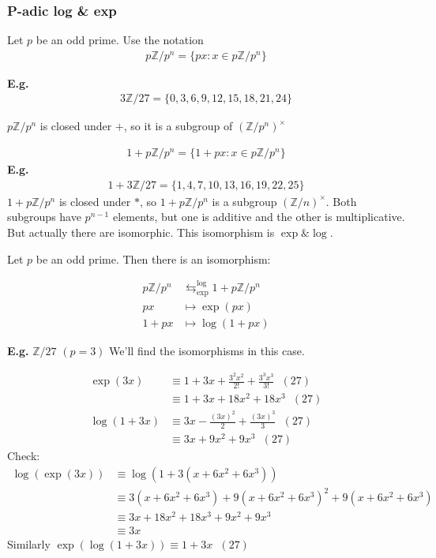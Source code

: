 \documentclass[11pt]{article}
\begin{document}
\subsubsection{P-adic log \& exp}
Let $p$ be an odd prime. Use the notation 
\begin{align*}
	p\mathbb{Z}/p^n = \{ px \colon x \in p\mathbb{Z}/p^n \}
\end{align*}

\textbf{E.g.}
\begin{align*}
	3\mathbb{Z}/27 = \{0,3,6,9,12,15,18,21,24\}
\end{align*}

$p\mathbb{Z}/p^n$ is closed under $+$, so it is a subgroup of $(\mathbb{Z}/p^n)^\times $

\begin{align*}
	1+p\mathbb{Z}/p^n = \{ 1+px \colon x \in p\mathbb{Z}/p^n \}
\end{align*}
\textbf{E.g.}
\begin{align*}
	1+3\mathbb{Z}/27 = \{1,4,7,10,13,16,19,22,25\}
\end{align*}
$1+p\mathbb{Z}/p^n $ is closed under $*$, so $1+p\mathbb{Z}/p^n $ is a subgroup $(\mathbb{Z}/n)^\times$. Both subgroups have $p^{n-1}$ elements, but one is additive and the other is multiplicative. But actually there are isomorphic. This isomorphism is $\exp \& \log$.
\begin{theorem}
Let $p$ be an odd prime. Then there is an isomorphism:

	\begin{align*}
		p\mathbb{Z}/p^n &\leftrightarrows^{{\text{log}}}_{\text{exp}} 1 + p\mathbb{Z}/p^n\\[1em]
		px &\longmapsto \exp(px)\\
		1+px &\longmapsto \log(1+px) 	
	\end{align*}
\end{theorem}
\textbf{E.g.} $\mathbb{Z}/27$  $(p=3)$ We'll find the isomorphisms in this case.

\begin{align*}
	\exp(3x) &\equiv 1 +3x + \frac{3^2x^2}{2!} +\frac{3^3x^3}{3!}\hspace{7pt} (27)\\
	&\equiv 1+ 3x + 18x^2 + 18x^3 \hspace{7pt} (27)\\[1em]
	\log(1+3x) &\equiv 3x - \frac{(3x)^2}{2} + \frac{(3x)^3}{3}\hspace{7pt} (27)\\
	& \equiv 3x + 9x^2 + 9x^3\hspace{7pt} (27) 
\end{align*}
Check:
\begin{align*}
	\log(\exp(3x)) &\equiv \log(1+ 3(x+6x^2+6x^3))\\
	&\equiv 3(x+6x^2+6x^3)+9(x+6x^2+6x^3)^2 + 9(x+6x^2+6x^3)\\
	&\equiv  3x+18x^2+18x^3 + 9x^2 +9x^3 \\
	&\equiv 3x
\end{align*}
Similarly $\exp(\log(1+3x)) \equiv 1+3x \hspace{7pt} (27)$
\end{document}
